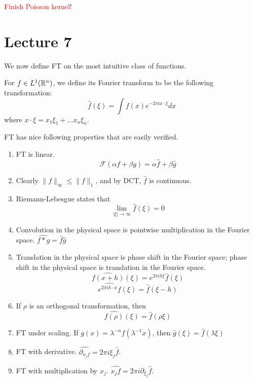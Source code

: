 \textcolor{red}{Finish Poisson kernel!}

\section{Lecture 7}
We now define FT on the most intuitive class of functions.
\begin{definition}[FT on $L^1$]
    For $f\in L^1(\mathbb{R}^n)$, we define its Fourier transform to be the following transformation:
    \begin{equation*}
        \widehat{f}(\xi)=\int f(x)e^{-2\pi ix\cdot\xi}dx
    \end{equation*}
    where $x\cdot\xi=x_1\xi_1+...x_n\xi_n$. 
\end{definition}
FT has nice following properties that are easily verified.
\begin{proposition}
    \begin{enumerate}
        \item FT is linear. 
        \begin{equation*}
            \mathcal{F}(\alpha f+\beta g)=\alpha\hat{f}+\beta\hat{g}
        \end{equation*}
        \item Clearly $\|f\|_\infty\leq\|f\|_1$, and by DCT, $\hat{f}$ is continuous.
        \item Riemann-Lebesgue states that 
        \begin{equation*}
            \lim_{|\xi|\to\infty}\hat{f}(\xi)=0
        \end{equation*}
        \item Convolution in the physical space is pointwise multiplication in the Fourier space. $\widehat{f\ast g}=\hat{f}\hat{g}$
        \item Translation in the physical space is phase shift in the Fourier space; phase shift in the physical space is translation in the Fourier space.
        \begin{equation*}
            \widehat{f(x+h)}(\xi)=e^{2\pi ih\dot\xi}\hat{f}(\xi)
        \end{equation*}
        \begin{equation*}
            \widehat{e^{2\pi ih\cdot x}f}(\xi)=\hat{f}(\xi-h)
        \end{equation*}
        \item If $\rho$ is an orthogonal transformation, then 
        \begin{equation*}
            \widehat{f(\rho)}(\xi)=\hat{f}(\rho\xi)
        \end{equation*}
        \item FT under scaling. If $g(x)=\lambda^{-n}f(\lambda^{-1}x)$, then $\hat{g}(\xi)=\hat{f}(\lambda\xi)$
        \item FT with derivative. $\widehat{\partial_{x_j f}}=2\pi i\xi_j\hat{f}$.
        \item FT with multiplication by $x_j$. $\widehat{x_jf}=2\pi i\partial_{\xi_j}\hat{f}$.
    \end{enumerate}
\end{proposition}

